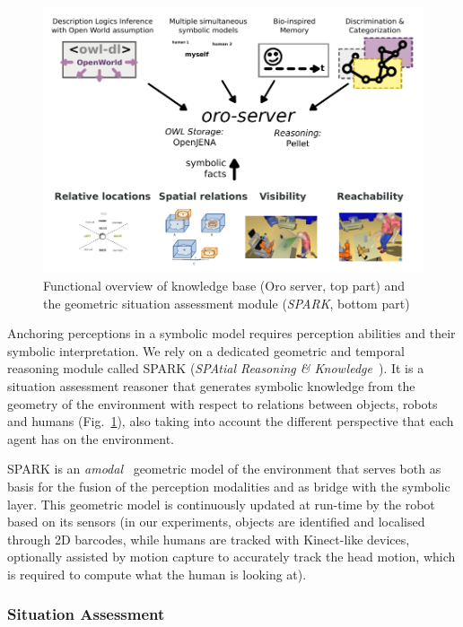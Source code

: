 \documentclass[preprint,5p]{elsarticle}
\begin{document}
\begin{figure}
        \centering
        \includegraphics[width=\columnwidth]{spark-oro}
    \caption{Functional overview of knowledge base ({\sc Oro} server, top part) and the geometric situation assessment module (\emph{SPARK}, bottom part)}
        \label{fig|spark-oro}
\end{figure}

Anchoring perceptions in a symbolic model requires perception abilities and
their symbolic interpretation. We rely on a dedicated geometric and temporal
reasoning module called SPARK (\emph{SPAtial Reasoning \&
Knowledge}~\cite{Sisbot2011}). It is a situation assessment reasoner that
generates symbolic knowledge from the geometry of the environment with respect
to relations between objects, robots and humans (Fig.~\ref{fig|spark-oro}),
also taking into account the different perspective that each agent has on the
environment.

SPARK is an \emph{amodal}~\cite{Mavridis2006} geometric model of the
environment that serves both as basis for the fusion of the perception
modalities and as bridge with the symbolic layer. This geometric model is
continuously updated at run-time by the robot based on its sensors (in our
experiments, objects are identified and localised through 2D barcodes, while
humans are tracked with Kinect-like devices, optionally assisted by motion
capture to accurately track the head motion, which is required to compute what
the human is looking at).


\subsubsection{Situation Assessment}
\end{document}
